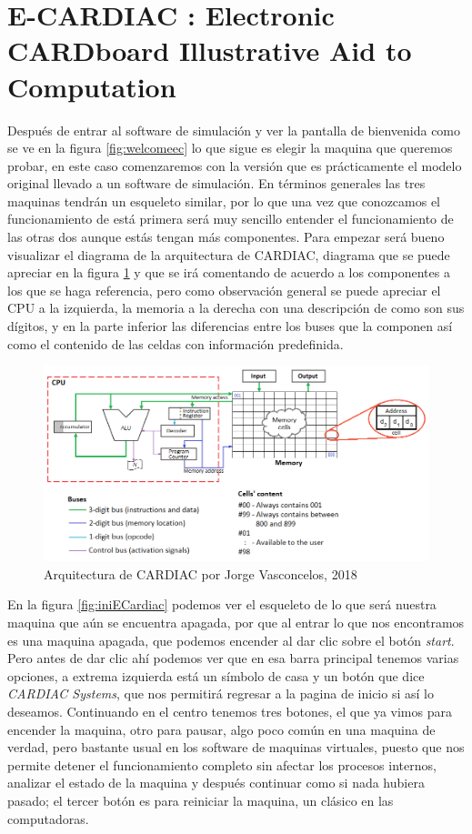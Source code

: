 \documentclass[letterpaper,12pt,oneside]{book}
\begin{document}
	\clearpage
	\section{E-CARDIAC : Electronic CARDboard Illustrative Aid to Computation}
	
	Después de entrar al software de simulación y ver la pantalla de bienvenida como se ve en la figura \ref{fig:welcomeec} lo que sigue es elegir la maquina
	que queremos probar, en este caso comenzaremos con la versión que es prácticamente el modelo original
	llevado a un software de simulación. En términos
	generales las tres maquinas tendrán un esqueleto similar, por lo que una vez que conozcamos el funcionamiento de está primera será muy sencillo
	entender el funcionamiento de las otras dos aunque estás tengan más componentes. Para empezar será bueno visualizar el diagrama de la arquitectura de CARDIAC, diagrama 
	que se puede apreciar en la figura \ref{fig:arqCardiac} y que se irá comentando de acuerdo a los componentes a los que se haga referencia, pero
	como observación general se puede apreciar el CPU a la izquierda, la memoria a la derecha con una descripción de como son sus dígitos, y en la parte
	inferior las diferencias entre los buses que la componen así como el contenido de las celdas con información predefinida.
	
	\begin{figure}[h]
 			\centering
			\includegraphics[scale=0.5]{media/ECARDIAC/arq_cardiac.png}
			\caption{Arquitectura de CARDIAC por Jorge Vasconcelos, 2018}
			\label{fig:arqCardiac}
	\end{figure}	
	
	En la figura \ref{fig:iniECardiac} podemos ver el esqueleto de lo que será nuestra maquina que aún se encuentra apagada, por que al entrar
	lo que nos encontramos es una maquina apagada, que podemos encender al dar clic sobre el botón \textit{start}. Pero antes de dar clic ahí podemos
	ver que en esa barra principal tenemos varias opciones, a extrema izquierda está un símbolo de casa y un botón que dice \textit{CARDIAC Systems}, que
	nos permitirá regresar a la pagina de inicio si así lo deseamos. Continuando en el centro tenemos tres botones, el que ya vimos para encender
	la maquina, otro para pausar, algo poco común en una maquina de verdad, pero bastante usual en los software de maquinas virtuales, puesto
	que nos permite detener el funcionamiento completo sin afectar los procesos internos, analizar el estado
	de la maquina y después continuar como si nada hubiera pasado; el tercer botón es para reiniciar la maquina, un clásico en las computadoras.
	
\end{document}
